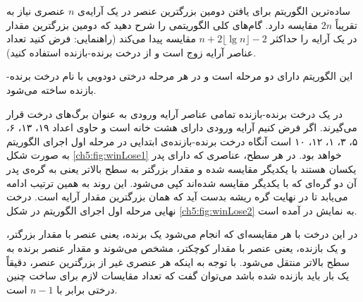 
 ساده‌ترین الگوریتم برای یافتن دومین بزرگترین عنصر در یک آرایه‌ی {$n$} عنصری نیاز به تقریباً {$2n$} مقایسه دارد. گام‌های کلی الگوریتمی را شرح دهید که دومین بزرگترین مقدار در یک آرایه را حداکثر {$n+2\lfloor \lg n \rfloor - 2$} مقایسه پیدا می‌کند (راهنمایی: فرض کنید تعداد عناصر آرایه زوج است و از درخت‌ برنده-بازنده استفاده کنید).


این الگوریتم دارای دو مرحله است و در هر مرحله درختی دودویی با نام درخت برنده-بازنده ساخته می‌شود.

در یک درخت برنده-بازنده تمامی عناصر آرایه ورودی به عنوان برگ‌های درخت قرار می‌گیرند. اگر فرض کنیم آرایه ورودی دارای هشت خانه است و حاوی اعداد ۱۹، ۱۳، ۶، ۵، ۳، ۱، ۱۲، ۱۰ است آنگاه درخت برنده-بازنده‌ی ابتدایی در مرحله اول اجرای الگوریتم به صورت شکل {\eqref{ch5:fig:winLose1}} خواهد بود. در هر سطح، عناصری که دارای پدر یکسان هستند با یکدیگر مقایسه شده و مقدار بزرگتر به سطح بالاتر یعنی به گره‌ی پدر آن دو گره‌ای که با یکدیگر مقایسه شده‌اند کپی می‌شود. این روند به همین ترتیب ادامه می‌یابد تا در نهایت گره ریشه بدست آید که همان بزرگترین مقدار آرایه است. درخت نهایی مرحله اول اجرای الگوریتم در شکل {\eqref{ch5:fig:winLose2}} به نمایش در آمده است. 

در این درخت با هر مقایسه‌ای که انجام می‌شود یک برنده، یعنی عنصر با مقدار بزرگتر، و یک بازنده، یعنی عنصر با مقدار کوچکتر، مشخص می‌شوند و مقدار عنصر برنده به سطح بالاتر منتقل می‌شود. با توجه به اینکه هر عنصری غیر از بزرگترین عنصر، دقیقاً یک بار باید بازنده شده‌ باشد می‌توان گفت که تعداد مقایسات لازم برای ساخت چنین درختی برابر با {$n-1$} است. 

